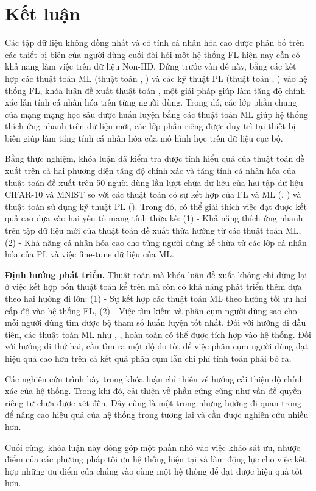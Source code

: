 \chapter{Kết luận}
\label{Chapter6}

Các tập dữ liệu không đồng nhất và có tính cá nhân hóa cao được phân bố trên các thiết bị biên của người dùng cuối đòi hỏi một hệ thống FL hiện nay cần có khả năng làm việc trên dữ liệu Non-IID. Đứng trước vấn đề này, bằng các kết hợp các thuật toán ML (thuật toán , ) và các kỹ thuật PL (thuật toán , ) vào hệ thống FL, khóa luận đề xuất thuật toán , một giải pháp giúp làm tăng độ chính xác lẫn tính cá nhân hóa trên từng người dùng. Trong đó, các lớp phần chung của mạng mạng học sâu được huấn luyện bằng các thuật toán ML giúp hệ thống thích ứng nhanh trên dữ liệu mới, các lớp phần riêng được duy trì tại thiết bị biên giúp làm tăng tính cá nhân hóa của mô hình học trên dữ liệu cục bộ.

Bằng thực nghiệm, khóa luận đã kiểm tra được tính hiểu quả của thuật toán đề xuất trên cả hai phương diện tăng độ chính xác và tăng tính cá nhân hóa của thuật toán đề xuất trên 50 người dùng lần lượt chứa dữ liệu của hai tập dữ liệu CIFAR-10 và MNIST so với các thuật toán có sự kết hợp của FL và ML (, ) và thuật toán sử dụng kỹ thuật PL (). Trong đó, có thể giải thích việc đạt được kết quả cao dựa vào hai yếu tố mang tính thừa kế: (1) - Khả năng thích ứng nhanh trên tập dữ liệu mới của thuật toán đề xuất thừa hưởng từ các thuật toán ML, (2) - Khả năng cá nhân hóa cao cho từng người dùng kế thừa từ các lớp cá nhân hóa của PL và việc fine-tune dữ liệu của ML.

\textbf{Định hướng phát triển.} Thuật toán mà khóa luận đề xuất không chỉ dừng lại ở việc kết hợp bốn thuật toán kể trên mà còn có khả năng phát triển thêm dựa theo hai hướng đi lớn: (1) - Sự kết hợp các thuật toán ML theo hướng tối ưu hai cấp độ vào hệ thống FL, (2) - Việc tìm kiếm và phân cụm người dùng sao cho mỗi người dùng tìm được bộ tham số huấn luyện tốt nhất. Đối với hướng đi đầu tiên, các thuật toán ML như  \cite{finn2017model},  \cite{nichol2018first},  \cite{rajeswaran2019meta} hoàn toàn có thể được tích hợp vào hệ thống. Đối với hướng đi thứ hai, cần tìm ra một độ đo tốt để việc phân cụm người dùng đạt hiệu quả cao hơn trên cả kết quả phân cụm lẫn chi phí tính toán phải bỏ ra.

Các nghiên cứu trình bày trong khóa luận chỉ thiên về hướng cải thiện độ chính xác của hệ thống. Trong khi đó, cải thiện về phần cứng cũng như vấn đề quyền riêng tư chưa được xét đến. Đây cũng là một trong những hướng đi quan trọng để nâng cao hiệu quả của hệ thống trong tương lai và cần được nghiên cứu nhiều hơn.

Cuối cùng, khóa luận này đóng góp một phần nhỏ vào việc khảo sát ưu, nhược điểm của các phương pháp tối ưu hệ thống hiện tại và làm động lực cho việc kết hợp những ưu điểm của chúng vào cùng một hệ thống để đạt được hiệu quả tốt hơn.
